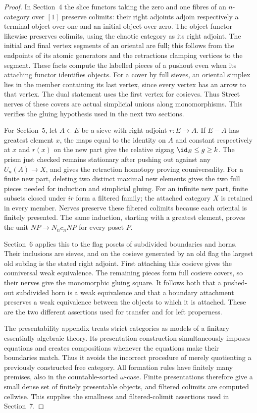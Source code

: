 \begin{proof}
In Section~4 the slice functors taking the zero and one fibres of
an $n$-category over $[1]$ preserve colimits: their right adjoints
adjoin respectively a terminal object over one and an initial
object over zero. The object functor likewise preserves colimits,
using the chaotic category as its right adjoint. The initial and
final vertex segments of an oriental are full; this follows from
the endpoints of its atomic generators and the retractions clamping
vertices to the segment. These facts compute the labelled pieces
of a pushout even when its attaching functor identifies objects.
For a cover by full sieves, an oriental simplex lies in the member
containing its last vertex, since every vertex has an arrow to that
vertex. The dual statement uses the first vertex for cosieves.
Thus Street nerves of these covers are actual simplicial unions
along monomorphisms. This verifies the gluing hypothesis used in
the next two sections.

For Section~5, let $A\subset E$ be a sieve with right adjoint
$r:E\to A$. If $E-A$ has greatest element $x$, the maps equal to
the identity on $A$ and constant respectively at $x$ and $r(x)$
on the new part give the relative zigzag
$\id_E\leq g\geq k$. The prism just checked remains stationary
after pushing out against any $U_n(A)\to X$, and gives the
retraction homotopy proving couniversality. For a finite new part,
deleting two distinct maximal new elements gives the two full
pieces needed for induction and simplicial gluing. For an infinite
new part, finite subsets closed under $ir$ form a filtered family;
the attached category $X$ is retained in every member. Nerves
preserve these filtered colimits because each oriental is finitely
presented. The same induction, starting with a greatest element,
proves the unit $NP\to N_n c_nNP$ for every poset $P$.

Section~6 applies this to the flag posets of subdivided boundaries
and horns. Their inclusions are sieves, and on the cosieve generated
by an old flag the largest old subflag is the stated right adjoint.
First attaching this cosieve gives the couniversal weak equivalence.
The remaining pieces form full cosieve covers, so their nerves
give the monomorphic gluing square. It follows both that a pushed-out
subdivided horn is a weak equivalence and that a boundary attachment
preserves a weak equivalence between the objects to which it is
attached. These are the two different assertions used for transfer
and for left properness.

The presentability appendix treats strict categories as models of a
finitary essentially algebraic theory. Its presentation construction
simultaneously imposes equations and creates compositions whenever
the equations make their boundaries match. Thus it avoids the
incorrect procedure of merely quotienting a previously constructed
free category. All formation rules have finitely many premises,
also in the countable-sorted $\omega$-case. Finite presentations
therefore give a small dense set of finitely presentable objects,
and filtered colimits are computed cellwise. This supplies the
smallness and filtered-colimit assertions used in Section~7.


\end{proof}
